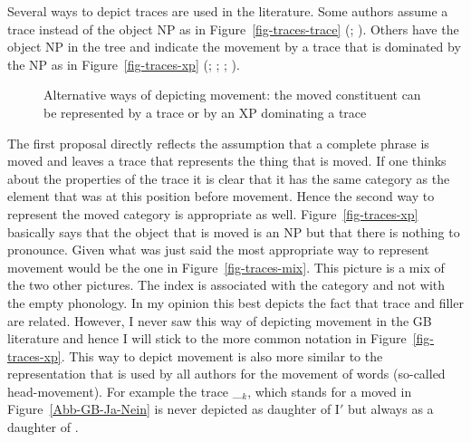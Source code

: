 Several ways to depict traces are used in the literature. Some authors assume a trace instead of
the object NP as in Figure~\ref{fig-traces-trace} (\citealp[, 322]{Grewendorf88a};
\citealp[]{Haegeman94a-u}). Others have the object NP in the tree and indicate the movement
by a trace that is dominated by the NP as in Figure~\ref{fig-traces-xp} (\citealp[]{SS88a};
\citealp[]{Grewendorf88a}; %
\citealp[]{Haegeman94a-u}; \citealp[]{Sternefeld2006a-u}).
\begin{figure}[htb]
\hfill{}
\hfill
{}
\hfill
{}
\hfill\mbox{}
\caption{Alternative ways of depicting movement: the moved constituent can be represented by a trace
or by an XP dominating a trace}\label{fig-traces}
\end{figure}
The first proposal directly reflects the assumption that a complete phrase is moved and leaves a trace that
represents the thing that is moved. If one thinks about the properties of the trace it is clear that
it has the same category as the element that was at this position before movement. Hence the second
way to represent the moved category is appropriate as well. Figure~\ref{fig-traces-xp} basically says that the object that is moved is an NP but that there is
nothing to pronounce. Given what was just said the most appropriate way to represent
movement would be the one in Figure~\ref{fig-traces-mix}. 
This picture is a mix of the two other pictures. The index is associated with
the category and not with the empty phonology. In my opinion this best depicts the fact that trace and
filler are related. However, I never saw this way of depicting movement in the GB literature and
hence I will stick to the more common notation in Figure~\ref{fig-traces-xp}. This way to depict
movement is also more similar to the representation that is used by all authors for the movement of
words (so-called head-movement). For example the trace \_$_k$, which stands for a moved \inull in
Figure~\ref{Abb-GB-Ja-Nein} is never depicted as daughter of I$'$ but always as a daughter of \inull.


